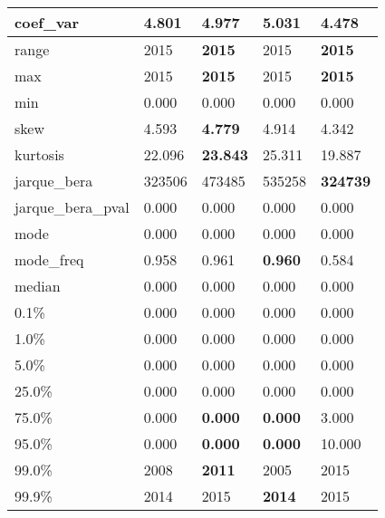 \begin{table}[H]
\begin{tabular}{|l|m{10em}|m{10em}|m{10em}|m{10em}|}
\hline coef\_var & 4.801 & \bfseries 4.977 & 5.031 & \cellcolor[rgb]{0.9, 0.54, 0.52} 4.478 \\
\hline range & 2015 & \bfseries 2015 & \cellcolor[rgb]{0.9, 0.54, 0.52} 2015 & \bfseries 2015 \\
\hline max & 2015 & \bfseries 2015 & \cellcolor[rgb]{0.9, 0.54, 0.52} 2015 & \bfseries 2015 \\
\hline min & 0.000 & 0.000 & 0.000 & 0.000 \\
\hline skew & 4.593 & \bfseries 4.779 & \cellcolor[rgb]{0.9, 0.54, 0.52} 4.914 & 4.342 \\
\hline kurtosis & 22.096 & \bfseries 23.843 & \cellcolor[rgb]{0.9, 0.54, 0.52} 25.311 & 19.887 \\
\hline jarque\_bera & 323506 & 473485 & \cellcolor[rgb]{0.9, 0.54, 0.52} 535258 & \bfseries 324739 \\
\hline jarque\_bera\_pval & 0.000 & 0.000 & 0.000 & 0.000 \\
\hline mode & 0.000 & 0.000 & 0.000 & 0.000 \\
\hline mode\_freq & 0.958 & 0.961 & \bfseries 0.960 & \cellcolor[rgb]{0.9, 0.54, 0.52} 0.584 \\
\hline median & 0.000 & 0.000 & 0.000 & 0.000 \\
\hline 0.1\% & 0.000 & 0.000 & 0.000 & 0.000 \\
\hline 1.0\% & 0.000 & 0.000 & 0.000 & 0.000 \\
\hline 5.0\% & 0.000 & 0.000 & 0.000 & 0.000 \\
\hline 25.0\% & 0.000 & 0.000 & 0.000 & 0.000 \\
\hline 75.0\% & 0.000 & \bfseries 0.000 & \bfseries 0.000 & \cellcolor[rgb]{0.9, 0.54, 0.52} 3.000 \\
\hline 95.0\% & 0.000 & \bfseries 0.000 & \bfseries 0.000 & \cellcolor[rgb]{0.9, 0.54, 0.52} 10.000 \\
\hline 99.0\% & 2008 & \bfseries 2011 & 2005 & \cellcolor[rgb]{0.9, 0.54, 0.52} 2015 \\
\hline 99.9\% & 2014 & 2015 & \bfseries 2014 & \cellcolor[rgb]{0.9, 0.54, 0.52} 2015 \\
\hline
\end{tabular}
\end{table}
